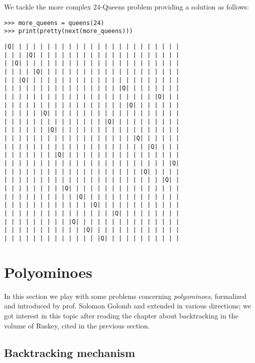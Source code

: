\begin{example}
We tackle the more complex $24$-Queens problem providing a
solution as follows:
\begin{verbatim}
>>> more_queens = queens(24)
>>> print(pretty(next(more_queens)))
\end{verbatim}
\begin{Verbatim}[baselinestretch=0.1, fontsize=\small]
|Q| | | | | | | | | | | | | | | | | | | | | | | |
| | | |Q| | | | | | | | | | | | | | | | | | | | |
| |Q| | | | | | | | | | | | | | | | | | | | | | |
| | | | |Q| | | | | | | | | | | | | | | | | | | |
| | |Q| | | | | | | | | | | | | | | | | | | | | |
| | | | | | | | | | | | | | | | |Q| | | | | | | |
| | | | | | | | | | | | | | | | | | | | | |Q| | |
| | | | | | | | | | | | | | | | | |Q| | | | | | |
| | | | | |Q| | | | | | | | | | | | | | | | | | |
| | | | | | | | | | | | | | |Q| | | | | | | | | |
| | | | | | |Q| | | | | | | | | | | | | | | | | |
| | | | | | | | | | | | | | | | | | |Q| | | | | |
| | | | | | | | | | | | | | | | | | | | |Q| | | |
| | | | | | | |Q| | | | | | | | | | | | | | | | |
| | | | | | | | | | | | | | | | | | | | | | | |Q|
| | | | | | | | | | | | | | | | | | | |Q| | | | |
| | | | | | | | | | | | | | | | | | | | | | |Q| |
| | | | | | | | |Q| | | | | | | | | | | | | | | |
| | | | | | | | | | |Q| | | | | | | | | | | | | |
| | | | | | | | | | | | |Q| | | | | | | | | | | |
| | | | | | | | | | | | | | | |Q| | | | | | | | |
| | | | | | | | | |Q| | | | | | | | | | | | | | |
| | | | | | | | | | | |Q| | | | | | | | | | | | |
| | | | | | | | | | | | | |Q| | | | | | | | | | |
\end{Verbatim}
\end{example}

\section{Polyominoes}


In this section we play with some problems concerning \textit{polyominoes},
formalized and introduced by prof. Solomon Golomb and extended in various
directions; we got interest in this topic after reading the chapter about
backtracking in the volume of Ruskey, cited in the previous section.

\subsection{Backtracking mechanism}

